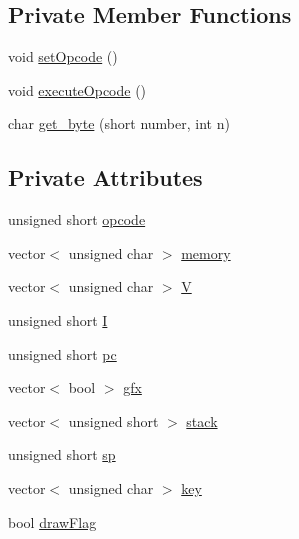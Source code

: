 \subsection*{Private Member Functions}
\begin{DoxyCompactItemize}
\item 
void \hyperlink{classCPU_a0885351f4eab9a347c4f3ecff6cd5365}{set\-Opcode} ()
\item 
void \hyperlink{classCPU_acb46c1c498f7bde079e70d839c66edf0}{execute\-Opcode} ()
\item 
char \hyperlink{classCPU_a61665d64843633ca2f182f02d425f486}{get\-\_\-byte} (short number, int n)
\end{DoxyCompactItemize}
\subsection*{Private Attributes}
\begin{DoxyCompactItemize}
\item 
unsigned short \hyperlink{classCPU_a494cb1c2ba6ce16e3a900eaf7b1a5f63}{opcode}
\item 
vector$<$ unsigned char $>$ \hyperlink{classCPU_ab3122e590fe92912f56e1dc5192b9a39}{memory}
\item 
vector$<$ unsigned char $>$ \hyperlink{classCPU_a2fc154eb8eb17dd75c897fc69c48ab31}{V}
\item 
unsigned short \hyperlink{classCPU_adf1fd15edb984e81a9f7adda264aa77a}{I}
\item 
unsigned short \hyperlink{classCPU_a7ebf891c17b973e7aa4b1c2164dcab53}{pc}
\item 
vector$<$ bool $>$ \hyperlink{classCPU_af5dd2f68fb212c8c39fad8522536c8aa}{gfx}
\item 
vector$<$ unsigned short $>$ \hyperlink{classCPU_a89db51ac963d4badd4c9c7a701f1edea}{stack}
\item 
unsigned short \hyperlink{classCPU_a4d0854788d689d0f4ee604f3001b1732}{sp}
\item 
vector$<$ unsigned char $>$ \hyperlink{classCPU_a043e3d085471f4edd7dded7d6b5c399f}{key}
\item 
bool \hyperlink{classCPU_adccd58a3784f03ab908982b072139c1a}{draw\-Flag}
\end{DoxyCompactItemize}


